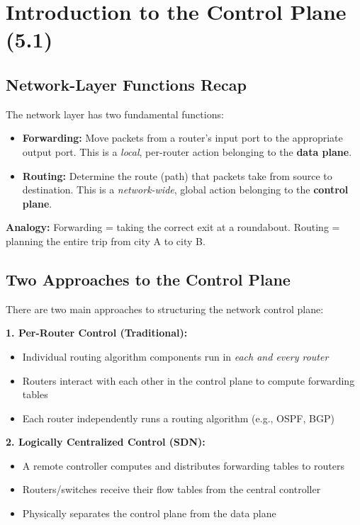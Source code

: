 \section{Introduction to the Control Plane (5.1)}

\subsection{Network-Layer Functions Recap}

\begin{keybox}
The network layer has two fundamental functions:
\begin{itemize}[noitemsep]
    \item \textbf{Forwarding:} Move packets from a router's input port to the appropriate output port. This is a \emph{local}, per-router action belonging to the \textbf{data plane}.
    \item \textbf{Routing:} Determine the route (path) that packets take from source to destination. This is a \emph{network-wide}, global action belonging to the \textbf{control plane}.
\end{itemize}

\medskip
\textbf{Analogy:} Forwarding = taking the correct exit at a roundabout. Routing = planning the entire trip from city A to city B.
\end{keybox}

\subsection{Two Approaches to the Control Plane}

\begin{keybox}
There are two main approaches to structuring the network control plane:

\textbf{1. Per-Router Control (Traditional):}
\begin{itemize}[noitemsep]
    \item Individual routing algorithm components run in \emph{each and every router}
    \item Routers interact with each other in the control plane to compute forwarding tables
    \item Each router independently runs a routing algorithm (e.g., OSPF, BGP)
\end{itemize}

\textbf{2. Logically Centralized Control (SDN):}
\begin{itemize}[noitemsep]
    \item A remote controller computes and distributes forwarding tables to routers
    \item Routers/switches receive their flow tables from the central controller
    \item Physically separates the control plane from the data plane
\end{itemize}
\end{keybox}

